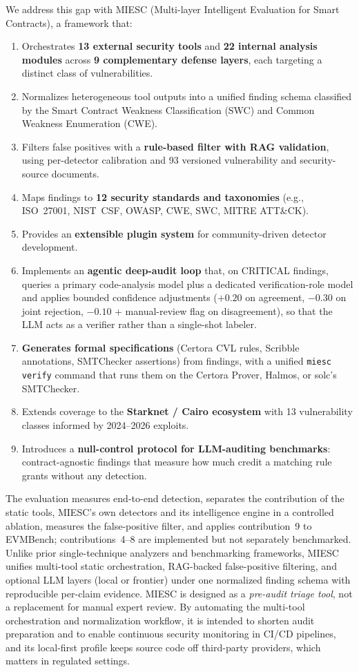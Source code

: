 \documentclass[conference]{IEEEtran}
\begin{document}
We address this gap with MIESC (Multi-layer Intelligent Evaluation for Smart Contracts), a framework that:
\begin{enumerate}
    \item Orchestrates \textbf{13 external security tools} and \textbf{22 internal analysis modules} across \textbf{9 complementary defense layers}, each targeting a distinct class of vulnerabilities.
    \item Normalizes heterogeneous tool outputs into a unified finding schema classified by the Smart Contract Weakness Classification (SWC) and Common Weakness Enumeration (CWE).
    \item Filters false positives with a \textbf{rule-based filter with RAG validation}, using per-detector calibration and 93 versioned vulnerability and security-source documents.
    \item Maps findings to \textbf{12 security standards and taxonomies} (e.g., ISO~27001, NIST~CSF, OWASP, CWE, SWC, MITRE ATT\&CK).
    \item Provides an \textbf{extensible plugin system} for community-driven detector development.
    \item Implements an \textbf{agentic deep-audit loop} that, on CRITICAL findings, queries a primary code-analysis model plus a dedicated verification-role model and applies bounded confidence adjustments ($+0.20$ on agreement, $-0.30$ on joint rejection, $-0.10$ + manual-review flag on disagreement), so that the LLM acts as a verifier rather than a single-shot labeler.
    \item \textbf{Generates formal specifications} (Certora CVL rules, Scribble annotations, SMTChecker assertions) from findings, with a unified \texttt{miesc verify} command that runs them on the Certora Prover, Halmos, or solc's SMTChecker.
    \item Extends coverage to the \textbf{Starknet / Cairo ecosystem} with 13 vulnerability classes informed by 2024--2026 exploits.
    \item Introduces a \textbf{null-control protocol for LLM-auditing benchmarks}: contract-agnostic findings that measure how much credit a matching rule grants without any detection.
\end{enumerate}

The evaluation measures end-to-end detection, separates the contribution of the static tools, MIESC's own detectors and its intelligence engine in a controlled ablation, measures the false-positive filter, and applies contribution~9 to EVMBench; contributions~4--8 are implemented but not separately benchmarked. Unlike prior single-technique analyzers and benchmarking frameworks, MIESC unifies multi-tool static orchestration, RAG-backed false-positive filtering, and optional LLM layers (local or frontier) under one normalized finding schema with reproducible per-claim evidence. MIESC is designed as a \emph{pre-audit triage tool}, not a replacement for manual expert review. By automating the multi-tool orchestration and normalization workflow, it is intended to shorten audit preparation and to enable continuous security monitoring in CI/CD pipelines, and its local-first profile keeps source code off third-party providers, which matters in regulated settings.
\end{document}
